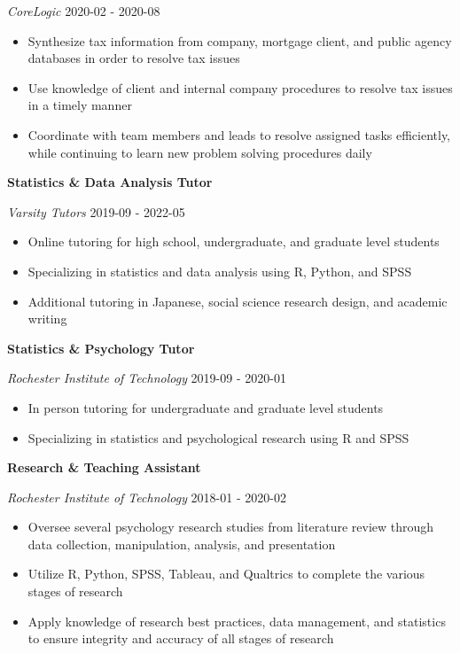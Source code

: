 \documentclass[a4paper,9pt]{extarticle}
\begin{document}
\noindent\textit{CoreLogic} \hfill 2020-02 - 2020-08
\begin{itemize}\item Synthesize tax information from company, mortgage client, and public agency databases in order to resolve tax issues
\item Use knowledge of client and internal company procedures to resolve tax issues in a timely manner
\item Coordinate with team members and leads to resolve assigned tasks efficiently, while continuing to learn new problem solving procedures daily
\end{itemize}
\noindent\textbf{Statistics \& Data Analysis Tutor} 

\noindent\textit{Varsity Tutors} \hfill 2019-09 - 2022-05
\begin{itemize}\item Online tutoring for high school, undergraduate, and graduate level students
\item Specializing in statistics and data analysis using R, Python, and SPSS
\item Additional tutoring in Japanese, social science research design, and academic writing
\end{itemize}
\noindent\textbf{Statistics \& Psychology Tutor} 

\noindent\textit{Rochester Institute of Technology} \hfill 2019-09 - 2020-01
\begin{itemize}\item In person tutoring for undergraduate and graduate level students
\item Specializing in statistics and psychological research using R and SPSS
\end{itemize}
\noindent\textbf{Research \& Teaching Assistant} 

\noindent\textit{Rochester Institute of Technology} \hfill 2018-01 - 2020-02
\begin{itemize}\item Oversee several psychology research studies from literature review through data collection, manipulation, analysis, and presentation
\item Utilize R, Python, SPSS, Tableau, and Qualtrics to complete the various stages of research
\item Apply knowledge of research best practices, data management, and statistics to ensure integrity and accuracy of all stages of research
\end{itemize}
\end{document}
